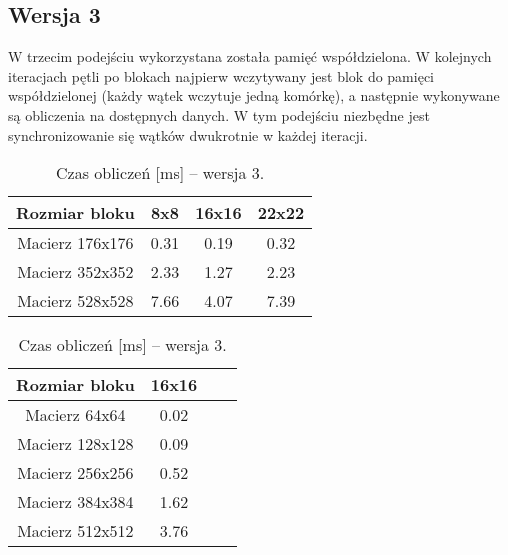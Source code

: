 
\subsection{Wersja 3}

W trzecim podejściu wykorzystana została pamięć współdzielona. W kolejnych iteracjach pętli po blokach najpierw wczytywany jest blok do pamięci współdzielonej (każdy wątek wczytuje jedną komórkę), a następnie wykonywane są obliczenia na dostępnych danych. W tym podejściu niezbędne jest synchronizowanie się wątków dwukrotnie w każdej iteracji.



\begin{table}[H]
\centering
\begin{tabular}{|c|c|c|c|}
\hline
Rozmiar bloku & 8x8 & 16x16 & 22x22 \\ \hline
Macierz 176x176 & 0.31 & 0.19 & 0.32 \\ \hline
Macierz 352x352 & 2.33 & 1.27 & 2.23 \\ \hline
Macierz 528x528 & 7.66 & 4.07 & 7.39 \\ \hline
\end{tabular}
\caption{Czas obliczeń [ms] -- wersja 3.}
\end{table}

\begin{table}[H]
\centering
\begin{tabular}{|c|c|c|c|}
\hline
Rozmiar bloku & 16x16 \\ \hline
Macierz 64x64 & 0.02 \\ \hline
Macierz 128x128 & 0.09 \\ \hline
Macierz 256x256 & 0.52 \\ \hline
Macierz 384x384 & 1.62 \\ \hline
Macierz 512x512 & 3.76 \\ \hline
\end{tabular}
\caption{Czas obliczeń [ms] -- wersja 3.}
\end{table}
